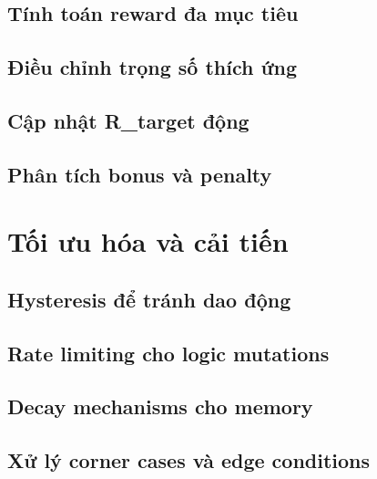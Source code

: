 \subsection{Tính toán reward đa mục tiêu}
\subsection{Điều chỉnh trọng số thích ứng}
\subsection{Cập nhật R_target động}
\subsection{Phân tích bonus và penalty}

\section{Tối ưu hóa và cải tiến}
\subsection{Hysteresis để tránh dao động}
\subsection{Rate limiting cho logic mutations}
\subsection{Decay mechanisms cho memory}
\subsection{Xử lý corner cases và edge conditions}
